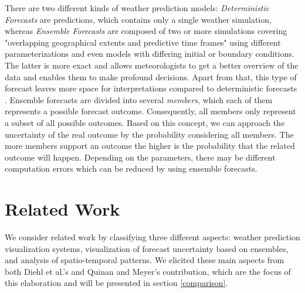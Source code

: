 \documentclass[citeauthoryear]{llncs}
\begin{document}
\begin{description}
There are two different kinds of weather prediction models: \textit{Deterministic Forecasts} are predictions, which contains only a single weather simulation, whereas \textit{Ensemble Forecasts} are composed of two or more simulations covering "overlapping geographical extents and predictive time frames" \cite{quinan2016visually} using different parameterizations and even models with differing initial or boundary conditions. The latter is more exact and allows meteorologists to get a better overview of the data and enables them to make profound decisions. Apart from that, this type of forecast leaves more space for interpretations compared to deterministic forecasts \cite{quinan2016visually}. Ensemble forecasts are divided into several \textit{members}, which each of them represents a possible forecast outcome. Consequently, all members only represent a subset of all possible outcomes. Based on this concept, we can approach the uncertainty of the real outcome by the probability considering all members. The more members support an outcome the higher is the probability that the related outcome will happen. Depending on the parameters, there may be different computation errors which can be reduced by using ensemble forecasts.
\end{description}
%

\section{Related Work}
We consider related work by classifying three different aspects: weather prediction visualization systems, visualization of forecast uncertainty based on ensembles, and analysis of spatio-temporal patterns. We elicited these main aspects from both Diehl et al.'s \cite{diehl2015visual} and Quinan and Meyer's \cite{quinan2016visually} contribution, which are the focus of this elaboration and will be presented in section \ref{comparison}.
\end{document}
